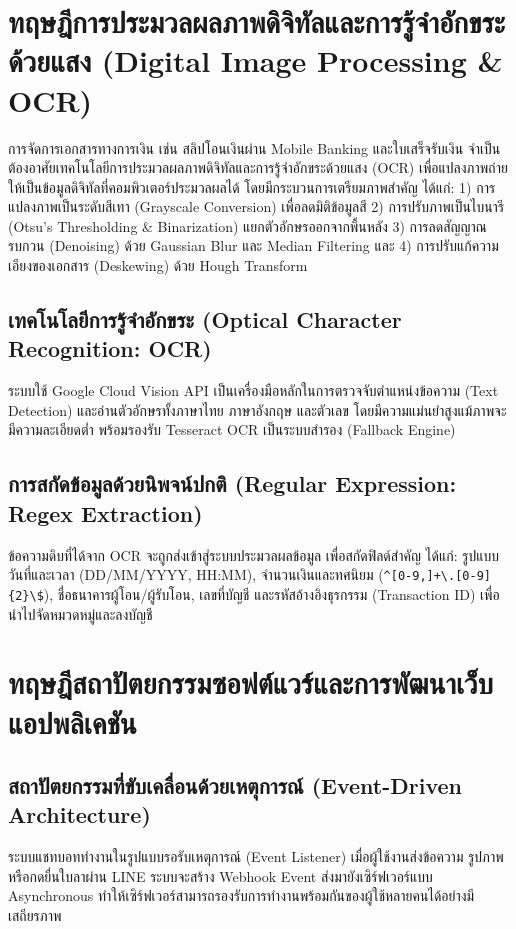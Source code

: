 \section{ทฤษฎีการประมวลผลภาพดิจิทัลและการรู้จำอักขระด้วยแสง (Digital Image Processing \& OCR)}
\hspace*{1.3em}
การจัดการเอกสารทางการเงิน เช่น สลิปโอนเงินผ่าน Mobile Banking และใบเสร็จรับเงิน จำเป็นต้องอาศัยเทคโนโลยีการประมวลผลภาพดิจิทัลและการรู้จำอักขระด้วยแสง (OCR) เพื่อแปลงภาพถ่ายให้เป็นข้อมูลดิจิทัลที่คอมพิวเตอร์ประมวลผลได้ โดยมีกระบวนการเตรียมภาพสำคัญ ได้แก่: 1) การแปลงภาพเป็นระดับสีเทา (Grayscale Conversion) เพื่อลดมิติข้อมูลสี 2) การปรับภาพเป็นไบนารี (Otsu's Thresholding \& Binarization) แยกตัวอักษรออกจากพื้นหลัง 3) การลดสัญญาณรบกวน (Denoising) ด้วย Gaussian Blur และ Median Filtering และ 4) การปรับแก้ความเอียงของเอกสาร (Deskewing) ด้วย Hough Transform

\subsection{เทคโนโลยีการรู้จำอักขระ (Optical Character Recognition: OCR)}
\hspace*{1.3em}
ระบบใช้ Google Cloud Vision API เป็นเครื่องมือหลักในการตรวจจับตำแหน่งข้อความ (Text Detection) และอ่านตัวอักษรทั้งภาษาไทย ภาษาอังกฤษ และตัวเลข โดยมีความแม่นยำสูงแม้ภาพจะมีความละเอียดต่ำ พร้อมรองรับ Tesseract OCR เป็นระบบสำรอง (Fallback Engine)

\subsection{การสกัดข้อมูลด้วยนิพจน์ปกติ (Regular Expression: Regex Extraction)}
\hspace*{1.3em}
ข้อความดิบที่ได้จาก OCR จะถูกส่งเข้าสู่ระบบประมวลผลข้อมูล เพื่อสกัดฟิลด์สำคัญ ได้แก่: รูปแบบวันที่และเวลา (DD/MM/YYYY, HH:MM), จำนวนเงินและทศนิยม (\verb|^[0-9,]+\.[0-9]{2}\$|), ชื่อธนาคารผู้โอน/ผู้รับโอน, เลขที่บัญชี และรหัสอ้างอิงธุรกรรม (Transaction ID) เพื่อนำไปจัดหมวดหมู่และลงบัญชี

\section{ทฤษฎีสถาปัตยกรรมซอฟต์แวร์และการพัฒนาเว็บแอปพลิเคชัน}

\subsection{สถาปัตยกรรมที่ขับเคลื่อนด้วยเหตุการณ์ (Event-Driven Architecture)}
\hspace*{1.3em}
ระบบแชทบอททำงานในรูปแบบรอรับเหตุการณ์ (Event Listener) เมื่อผู้ใช้งานส่งข้อความ รูปภาพ หรือกดยื่นใบลาผ่าน LINE ระบบจะสร้าง Webhook Event ส่งมายังเซิร์ฟเวอร์แบบ Asynchronous ทำให้เซิร์ฟเวอร์สามารถรองรับการทำงานพร้อมกันของผู้ใช้หลายคนได้อย่างมีเสถียรภาพ

